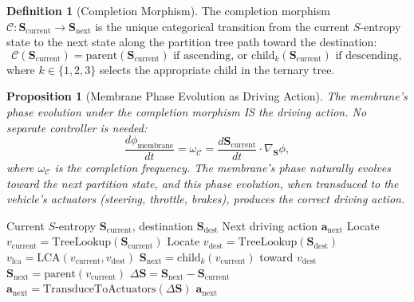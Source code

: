 \documentclass[twocolumn,10pt]{article}
\newtheorem{proposition}[theorem]{Proposition}
\theoremstyle{definition}
\newtheorem{definition}[theorem]{Definition}
\theoremstyle{remark}
\begin{document}
\begin{definition}[Completion Morphism]
\label{def:completion}
The completion morphism $\mathcal{C}: \mathbf{S}_{\mathrm{current}} \to \mathbf{S}_{\mathrm{next}}$ is the unique categorical transition from the current $S$-entropy state to the next state along the partition tree path toward the destination:
\begin{equation}
  \mathcal{C}(\mathbf{S}_{\mathrm{current}}) = \mathrm{parent}(\mathbf{S}_{\mathrm{current}}) \text{ if ascending, or } \mathrm{child}_k(\mathbf{S}_{\mathrm{current}}) \text{ if descending},
  \label{eq:completion_morphism}
\end{equation}
where $k \in \{1, 2, 3\}$ selects the appropriate child in the ternary tree.
\end{definition}

\begin{proposition}[Membrane Phase Evolution as Driving Action]
\label{prop:phase_driving}
The membrane's phase evolution under the completion morphism IS the driving action. No separate controller is needed:
\begin{equation}
  \frac{d\phi_{\mathrm{membrane}}}{dt} = \omega_{\mathcal{C}} = \frac{d\mathbf{S}_{\mathrm{current}}}{dt} \cdot \nabla_{\mathbf{S}} \phi,
  \label{eq:phase_driving}
\end{equation}
where $\omega_{\mathcal{C}}$ is the completion frequency. The membrane's phase naturally evolves toward the next partition state, and this phase evolution, when transduced to the vehicle's actuators (steering, throttle, brakes), produces the correct driving action.
\end{proposition}

\begin{algorithm}[H]
\caption{Backward Trajectory Completion Navigation}
\label{alg:navigation}
\begin{algorithmic}[1]
\REQUIRE Current $S$-entropy $\mathbf{S}_{\mathrm{current}}$, destination $\mathbf{S}_{\mathrm{dest}}$
\ENSURE Next driving action $\mathbf{a}_{\mathrm{next}}$
\STATE Locate $v_{\mathrm{current}} = \mathrm{TreeLookup}(\mathbf{S}_{\mathrm{current}})$
\STATE Locate $v_{\mathrm{dest}} = \mathrm{TreeLookup}(\mathbf{S}_{\mathrm{dest}})$
\STATE $v_{\mathrm{lca}} = \mathrm{LCA}(v_{\mathrm{current}}, v_{\mathrm{dest}})$  
  \STATE $\mathbf{S}_{\mathrm{next}} = \mathrm{child}_k(v_{\mathrm{current}})$ toward $v_{\mathrm{dest}}$
\ELSE
  \STATE $\mathbf{S}_{\mathrm{next}} = \mathrm{parent}(v_{\mathrm{current}})$  
\ENDIF
\STATE $\Delta\mathbf{S} = \mathbf{S}_{\mathrm{next}} - \mathbf{S}_{\mathrm{current}}$
\STATE $\mathbf{a}_{\mathrm{next}} = \mathrm{TransduceToActuators}(\Delta\mathbf{S})$
\RETURN $\mathbf{a}_{\mathrm{next}}$
\end{algorithmic}
\end{algorithm}
\end{document}
